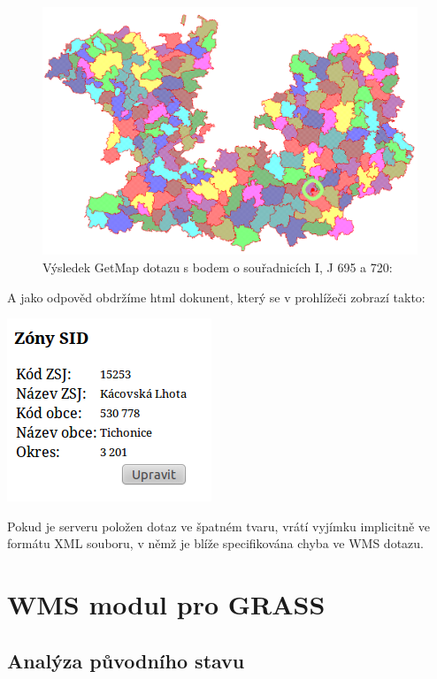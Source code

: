 \documentclass[a4paper,12pt]{article}
\begin{document}
  
\begin{figure}[h!]
 \includegraphics[scale=0.3]{getfeatureinfo.png}
  \caption{Výsledek GetMap dotazu s bodem o souřadnicích I, J  695 a 720:}
\end{figure}

A jako odpověd obdržíme html dokunent, který se v prohlížeči zobrazí takto:

 \includegraphics[scale=0.7]{getfeatureinforeply.png}


Pokud je serveru položen dotaz ve špatném tvaru, vrátí vyjímku implicitně ve formátu XML souboru, v němž je blíže specifikována chyba ve WMS dotazu. 


\newpage

\section{WMS modul pro GRASS}



\subsection{Analýza původního stavu}
 
\end{document}
